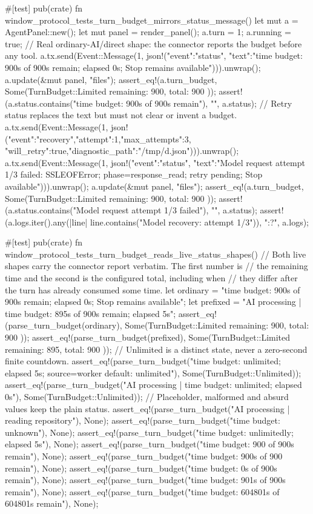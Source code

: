 {{{{    #[test]
    pub(crate) fn window_protocol_tests_turn_budget_mirrors_status_message() {
        let mut a = AgentPanel::new();
        let mut panel = render_panel();
        a.turn = 1;
        a.running = true;
        // Real ordinary-AI/direct shape: the connector reports the budget before any tool.
        a.tx.send(Event::Message(1, json!({"event":"status",
            "text":"time budget: 900s of 900s remain; elapsed 0s; Stop remains available"}))).unwrap();
        a.update(&mut panel, "files");
        assert_eq!(a.turn_budget, Some(TurnBudget::Limited { remaining: 900, total: 900 }));
        assert!(a.status.contains("time budget: 900s of 900s remain"), "{}", a.status);
        // Retry status replaces the text but must not clear or invent a budget.
        a.tx.send(Event::Message(1, json!({"event":"recovery","attempt":1,"max_attempts":3,
            "will_retry":true,"diagnostic_path":"/tmp/d.json"}))).unwrap();
        a.tx.send(Event::Message(1, json!({"event":"status",
            "text":"Model request attempt 1/3 failed: SSLEOFError; phase=response_read; retry pending; Stop available"}))).unwrap();
        a.update(&mut panel, "files");
        assert_eq!(a.turn_budget, Some(TurnBudget::Limited { remaining: 900, total: 900 }));
        assert!(a.status.contains("Model request attempt 1/3 failed"), "{}", a.status);
        assert!(a.logs.iter().any(|line| line.contains("Model recovery: attempt 1/3")), "{:?}", a.logs);
    }

    #[test]
    pub(crate) fn window_protocol_tests_turn_budget_reads_live_status_shapes() {
        // Both live shapes carry the connector report verbatim. The first number is
        // the remaining time and the second is the configured total, including when
        // they differ after the turn has already consumed some time.
        let ordinary = "time budget: 900s of 900s remain; elapsed 0s; Stop remains available";
        let prefixed = "AI processing | time budget: 895s of 900s remain; elapsed 5s";
        assert_eq!(parse_turn_budget(ordinary), Some(TurnBudget::Limited { remaining: 900, total: 900 }));
        assert_eq!(parse_turn_budget(prefixed), Some(TurnBudget::Limited { remaining: 895, total: 900 }));
        // Unlimited is a distinct state, never a zero-second finite countdown.
        assert_eq!(parse_turn_budget("time budget: unlimited; elapsed 5s; source=worker default: unlimited"), Some(TurnBudget::Unlimited));
        assert_eq!(parse_turn_budget("AI processing | time budget: unlimited; elapsed 0s"), Some(TurnBudget::Unlimited));
        // Placeholder, malformed and absurd values keep the plain status.
        assert_eq!(parse_turn_budget("AI processing | reading repository"), None);
        assert_eq!(parse_turn_budget("time budget: unknown"), None);
        assert_eq!(parse_turn_budget("time budget: unlimitedly; elapsed 5s"), None);
        assert_eq!(parse_turn_budget("time budget: 900 of 900s remain"), None);
        assert_eq!(parse_turn_budget("time budget: 900s of 900 remain"), None);
        assert_eq!(parse_turn_budget("time budget: 0s of 900s remain"), None);
        assert_eq!(parse_turn_budget("time budget: 901s of 900s remain"), None);
        assert_eq!(parse_turn_budget("time budget: 604801s of 604801s remain"), None);
    }

}}}}

